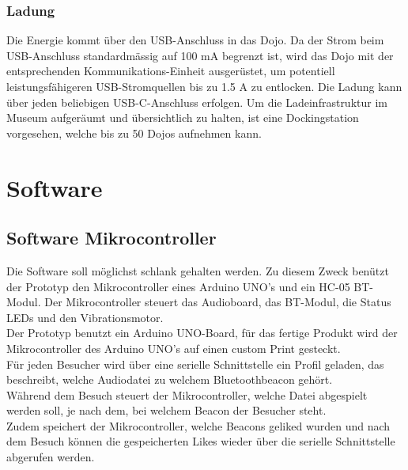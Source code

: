 \subsubsection{Ladung}
Die Energie kommt über den USB-Anschluss in das Dojo. Da der Strom beim USB-Anschluss standardmässig auf 100 mA begrenzt ist, wird das Dojo mit der entsprechenden Kommunikations-Einheit ausgerüstet, um potentiell leistungsfähigeren USB-Stromquellen bis zu 1.5 A zu entlocken. Die Ladung kann über jeden beliebigen USB-C-Anschluss erfolgen. Um die Ladeinfrastruktur im Museum aufgeräumt und übersichtlich zu halten, ist eine Dockingstation vorgesehen, welche bis zu 50 Dojos aufnehmen kann. 
\section{Software}
\subsection{Software Mikrocontroller}
Die Software soll möglichst schlank gehalten werden.
Zu diesem Zweck benützt der Prototyp den Mikrocontroller eines Arduino UNO's und ein HC-05 BT-Modul.
Der Mikrocontroller steuert das Audioboard, das BT-Modul, die Status LEDs und den Vibrationsmotor.\\[0.5cm]
Der Prototyp benutzt ein Arduino UNO-Board, für das fertige Produkt wird der Mikrocontroller des Arduino UNO's auf einen custom Print gesteckt.
\\[0.5cm]
Für jeden Besucher wird über eine serielle Schnittstelle ein Profil geladen, das beschreibt, welche Audiodatei zu welchem Bluetoothbeacon gehört. \\
Während dem Besuch steuert der Mikrocontroller, welche Datei abgespielt werden soll, je nach dem, bei welchem Beacon der Besucher steht.\\
Zudem speichert der Mikrocontroller, welche Beacons geliked wurden und nach dem Besuch können die gespeicherten Likes wieder über die serielle Schnittstelle abgerufen werden.\\
\newpage
